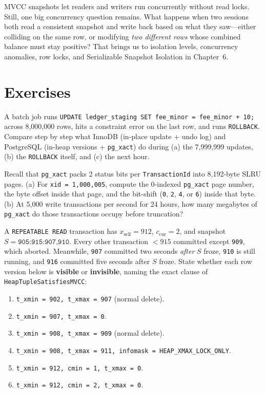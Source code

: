 MVCC snapshots let readers and writers run concurrently without read locks. Still, one big concurrency question remains. What happens when two sessions both read a consistent snapshot and write back based on what they saw---either colliding on the same row, or modifying \emph{two different rows} whose combined balance must stay positive? That brings us to isolation levels, concurrency anomalies, row locks, and Serializable Snapshot Isolation in Chapter~6.

\section{Exercises}
\label{ch05:exercises}

\begin{exercise}
A batch job runs \texttt{UPDATE ledger\_staging SET fee\_minor = fee\_minor + 10;} across 8,000,000 rows, hits a constraint error on the last row, and runs \texttt{ROLLBACK}. Compare step by step what InnoDB (in-place update + undo log) and PostgreSQL (in-heap versions + \texttt{pg\_xact}) do during (a) the 7,999,999 updates, (b) the \texttt{ROLLBACK} itself, and (c) the next hour.
\end{exercise}

\begin{exercise}
Recall that \texttt{pg\_xact} packs 2 status bits per \texttt{TransactionId} into 8,192-byte SLRU pages.
(a) For \texttt{xid = 1,000,005}, compute the 0-indexed \texttt{pg\_xact} page number, the byte offset inside that page, and the bit-shift (\texttt{0}, \texttt{2}, \texttt{4}, or \texttt{6}) inside that byte.
(b) At 5,000 write transactions per second for 24 hours, how many megabytes of \texttt{pg\_xact} do those transactions occupy before truncation?
\end{exercise}

\begin{exercise}
A \texttt{REPEATABLE READ} transaction has $x_{\text{self}} = 912$, $c_{\text{cur}} = 2$, and snapshot $S = \texttt{905:915:907,910}$. Every other transaction $< 915$ committed except \texttt{909}, which aborted. Meanwhile, \texttt{907} committed two seconds \emph{after} $S$ froze, \texttt{910} is still running, and \texttt{916} committed five seconds after $S$ froze.
State whether each row version below is \textbf{visible} or \textbf{invisible}, naming the exact clause of \texttt{HeapTupleSatisfiesMVCC}:
\begin{enumerate}
  \item \texttt{t\_xmin = 902, t\_xmax = 907} (normal delete).
  \item \texttt{t\_xmin = 907, t\_xmax = 0}.
  \item \texttt{t\_xmin = 908, t\_xmax = 909} (normal delete).
  \item \texttt{t\_xmin = 908, t\_xmax = 911, infomask = HEAP\_XMAX\_LOCK\_ONLY}.
  \item \texttt{t\_xmin = 912, cmin = 1, t\_xmax = 0}.
  \item \texttt{t\_xmin = 912, cmin = 2, t\_xmax = 0}.
\end{enumerate}
\end{exercise}

